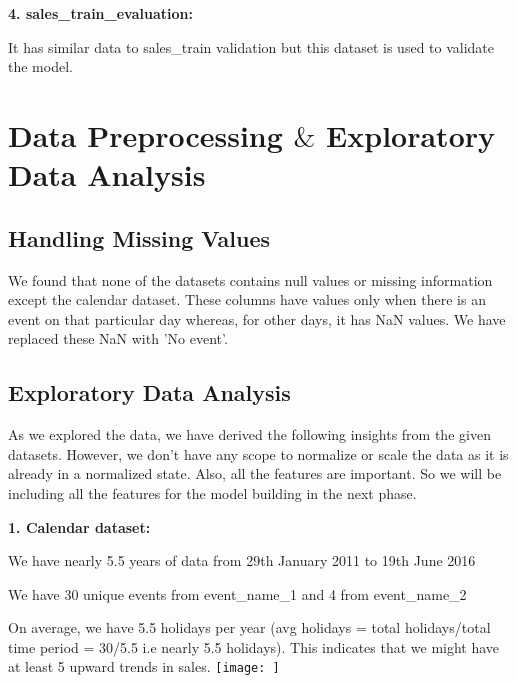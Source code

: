 \documentclass[fleqn,10pt]{SelfArx} %
\begin{document}
\item \textbf{4. sales\_train\_evaluation:}
\item It has similar data to sales\_train validation but this dataset is used to validate the model.

\bigskip
\bigskip


\section{Data Preprocessing $\&$ Exploratory Data Analysis} %


\subsection{Handling Missing Values}
We found that none of the datasets contains null values or missing information except the calendar dataset. These columns have values only when there is an event on that particular day whereas, for other days, it has NaN values. We have replaced these NaN with 'No event'.
\subsection{Exploratory Data Analysis}
As we explored the data, we have derived the following insights from the given datasets. However, we don't have any scope to normalize or scale the data as it is already in a normalized state. Also, all the features are important. So we will be including all the features for the model building in the next phase.
\item \textbf{1. Calendar dataset:}
\item We have nearly 5.5 years of data from 29th January 2011 to 19th June 2016
\item We have 30 unique events from event\_name\_1 and 4 from event\_name\_2
\item On average, we have 5.5 holidays per year (avg holidays = total holidays/total time period = 30/5.5 i.e nearly 5.5 holidays). This indicates that we might have at least 5 upward trends in sales.
\texttt{[image: ]}
\end{document}
